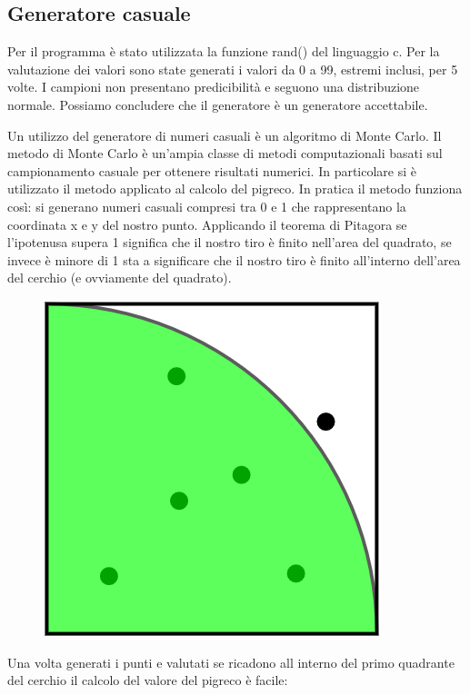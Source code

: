 \documentclass[12pt,a4paper]{report}
\begin{document}
\subsection{Generatore casuale}
Per il programma è stato utilizzata la funzione rand() del linguaggio c. Per la valutazione dei valori sono state generati i valori da 0 a 99, estremi inclusi, per 5 volte. I campioni non presentano predicibilità e seguono una distribuzione normale. Possiamo concludere che il generatore è un generatore accettabile.


Un utilizzo del generatore di numeri casuali è un algoritmo di Monte Carlo. Il metodo di Monte Carlo è un'ampia classe di metodi computazionali basati sul campionamento casuale per ottenere risultati numerici.  In particolare si è utilizzato il metodo applicato al calcolo del pigreco.
In pratica il metodo funziona così: si generano numeri casuali compresi tra 0 e 1 che rappresentano la coordinata x e y del nostro punto. Applicando il teorema di Pitagora se l’ipotenusa supera 1 significa che il nostro tiro è finito nell’area del quadrato, se invece è minore di 1 sta a significare che il nostro tiro è finito all’interno dell’area del cerchio (e ovviamente del quadrato). 


\begin{figure}[h]
\centering
\includegraphics[scale=0.3]{Img/qCirc.png}
\end{figure}
Una volta generati i punti e valutati se ricadono all interno del primo quadrante del cerchio il calcolo del valore del pigreco è facile: \\
\end{document}
